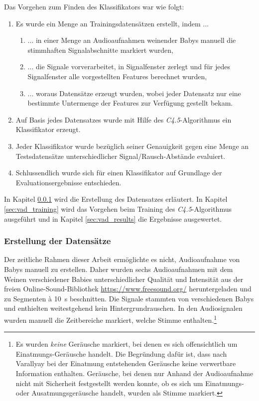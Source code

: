 Das Vorgehen zum Finden des Klassifikators war wie folgt:
\begin{enumerate}
\item Es wurde ein Menge an Trainingsdatensätzen erstellt, indem ...
	\begin{enumerate}[label*=\arabic*.]
	\item ... in einer Menge an Audioaufnahmen weinender Babys manuell die stimmhaften Signalabschnitte markiert wurden,
	\item ... die Signale vorverarbeitet, in Signalfenster zerlegt und für jedes Signalfenster alle vorgestellten Features berechnet wurden,
	\item ... woraus Datensätze erzeugt wurden, wobei jeder Datensatz nur eine bestimmte Untermenge der Features zur Verfügung gestellt bekam.
	\end{enumerate}
\item Auf Basis jedes Datensatzes wurde mit Hilfe des \emph{C4.5}-Algorithmus ein Klassifikator erzeugt.
\item Jeder Klassifikator wurde bezüglich seiner Genauigkeit gegen eine Menge an Testsdatensätze unterschiedlicher Signal/Rausch-Abstände evaluiert.
\item Schlussendlich wurde sich für einen Klassifikator auf Grundlage der Evaluationsergebnisse entschieden.
\end{enumerate}

In Kapitel \ref{sec:vad_database} wird die Erstellung des Datensatzes erläutert. In Kapitel \ref{sec:vad_training} wird das Vorgehen beim Training des \emph{C4.5}-Algorithmus ausgeführt und in Kapitel \ref{sec:vad_results} die Ergebnisse ausgewertet.

\subsubsection{Erstellung der Datensätze}
\label{sec:vad_database}

Der zeitliche Rahmen dieser Arbeit ermöglichte es nicht, Audioaufnahme von Babys manuell zu erstellen. Daher wurden sechs Audioaufnahmen mit dem Weinen verschiedener Babies unterschiedlicher Qualität und Intensität aus der freien Online-Sound-Bibliothek \url{https://www.freesound.org/} heruntergeladen und zu Segmenten \`{a} \SI{10}{\second} beschnitten. Die Signale stammten von verschiedenen Babys und enthielten weitestgehend kein Hintergrundrauschen. In den Audiosignalen wurden manuell die Zeitbereiche markiert, welche Stimme enthalten.\footnote{Es wurden \emph{keine} Geräusche markiert, bei denen es sich offensichtlich um Einatmungs-Geräusche handelt. Die Begründung dafür ist, dass nach Varallyay \cite{cry_thesis} bei der Einatmung entstehenden Geräusche keine verwertbare Information enthalten. Geräusche, bei denen nur Anhand der Audioaufnahme nicht mit Sicherheit festgestellt werden konnte, ob es sich um Einatmungs- oder Ausatmungsgeräusche handelt, wurden als Stimme markiert.}

